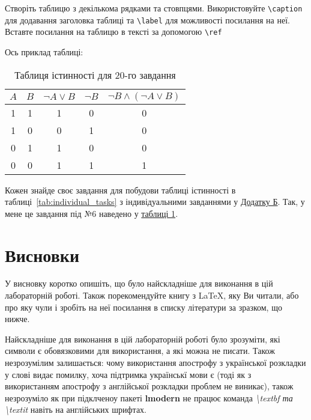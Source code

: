 \documentclass[14pt,a4paper,twoside]{article}
\begin{document}
	Створіть таблицю з декількома рядками та стовпцями. Використовуйте \texttt{\textbackslash caption} для додавання заголовка таблиці та \texttt{\textbackslash label} для можливості посилання на неї. Вставте посилання на таблицю в тексті за допомогою \texttt{\textbackslash ref}
	
	Ось приклад таблиці:
	
	
	\begin{table}[h]
		\centering
		\caption{Таблиця істинності для 20-го завдання} \label{sec:tabl_6}
		\label{tab:truth_table_20}
		\begin{tabular}{|c|c||c|c||c|}
			\hline
			\( A \) & \( B \) & \( \lnot A \lor B \) & \( \lnot B \) & \( \lnot B \land (\lnot A \lor B)  \) \\
			\hline
			\hline
			1 & 1 & 1 & 0 & 0 \\
			\hline
			1 & 0 & 0 & 1 & 0 \\
			\hline
			0 & 1 & 1 & 0 & 0\\
			\hline
			0 & 0 & 1 & 1 & 1 \\
			\hline
		\end{tabular}
	\end{table}
	
	
	
	Кожен знайде своє завдання для побудови таблиці істинності в таблиці~\ref{tab:individual_tasks} з індивідуальними завданнями у \hyperref[sec:appendix2]{Додатку Б}. Так, у мене це завдання під №6 наведено у  \hyperref[sec:tabl_6] {таблиці 1}.
	
	
	\section{Висновки}
	
	У висновку коротко опишіть, що було найскладніше для виконання в цій лабораторній роботі. 
	Також порекомендуйте книгу з LaTeX, яку Ви читали, або про яку чули і зробіть на неї посилання в списку літератури за зразком, що нижче.
	
	Найскладніше для виконання в цій лабораторній роботі було зрозуміти, які символи є обовязковими для використання, а які можна не писати. Також незрозумілим залишається: чому використання апострофу з української розкладки у слові видає помилку, хоча підтримка українськї мови є (тоді як з використанням апострофу з англійської розкладки проблем не виникає), також незрозуміло як при підклченоу пакеті \textbf{lmodern} не працює команда \textit{\textbackslash textbf та \textbackslash textit} навіть на англійських шрифтах.
	
\end{document}
